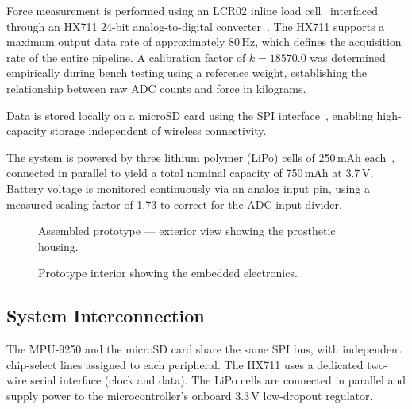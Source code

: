 Force measurement is performed using an LCR02 inline load
cell~\cite{LCR02} interfaced through an HX711 24-bit
analog-to-digital converter~\cite{HX711}.
The HX711 supports a maximum output data rate of approximately 80\,Hz,
which defines the acquisition rate of the entire pipeline.
A calibration factor of $k = 18570.0$ was determined empirically during
bench testing using a reference weight, establishing the relationship
between raw ADC counts and force in kilograms.

Data is stored locally on a microSD card using the SPI
interface~\cite{JoyIT_COMMSD}, enabling high-capacity storage
independent of wireless connectivity.

The system is powered by three lithium polymer (LiPo) cells of 250\,mAh
each~\cite{LiPo250mAh}, connected in parallel to yield a total nominal
capacity of 750\,mAh at 3.7\,V.
Battery voltage is monitored continuously via an analog input pin, using a
measured scaling factor of 1.73 to correct for the ADC input divider.

\begin{figure}[h]
  \centering
  \caption{Assembled prototype — exterior view showing the prosthetic housing.}
  \label{fig:prototype_exterior}
\end{figure}

\begin{figure}[h]
  \centering
  \caption{Prototype interior showing the embedded electronics.}
  \label{fig:prototype_interior}
\end{figure}

\subsection{System Interconnection}

The MPU-9250 and the microSD card share the same SPI bus, with independent
chip-select lines assigned to each peripheral.
The HX711 uses a dedicated two-wire serial interface (clock and data).
The LiPo cells are connected in parallel and supply power to the
microcontroller's onboard 3.3\,V low-dropout regulator.

